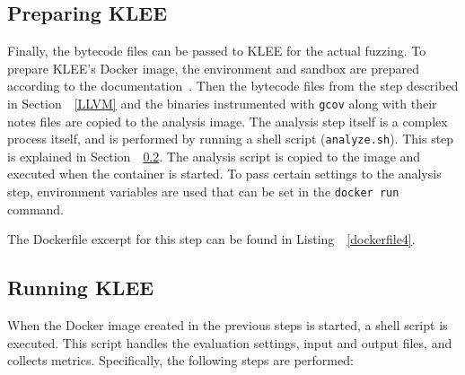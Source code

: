 \documentclass{article}
\let\savedCite=\cite
\renewcommand{\cite}{\unskip~\savedCite}
\let\savedRef=\ref
\renewcommand{\ref}{\unskip~\savedRef}
\begin{document}
\subsection{Preparing KLEE}

Finally, the bytecode files can be passed to KLEE for the actual fuzzing. To prepare KLEE's Docker image, the environment and sandbox are prepared according to the documentation\cite{KLEEFAQ}. Then the bytecode files from the step described in Section~\ref{LLVM} and the binaries instrumented with \lstinline{gcov} along with their notes files are copied to the analysis image. The analysis step itself is a complex process itself, and is performed by running a shell script (\lstinline{analyze.sh}). This step is explained in Section~\ref{analyze.sh}. The analysis script is copied to the image and executed when the container is started. To pass certain settings to the analysis step, environment variables are used that can be set in the \lstinline{docker run} command.

The Dockerfile excerpt for this step can be found in Listing~\ref{dockerfile4}.



\subsection{Running KLEE}
\label{analyze.sh}
When the Docker image created in the previous steps is started, a shell script is executed. This script handles the evaluation settings, input and output files, and collects metrics. Specifically, the following steps are performed:
\end{document}
